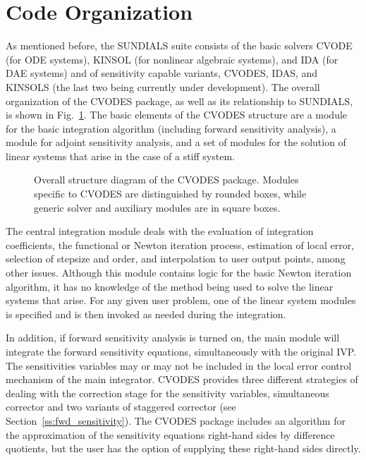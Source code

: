 \section{Code Organization}\label{s:organization}

As mentioned before, the SUNDIALS suite consists of the basic solvers
CVODE (for ODE systems), KINSOL (for nonlinear algebraic
systems), and IDA (for DAE systems) and of sensitivity capable variants,
CVODES, IDAS, and KINSOLS (the last two being currently under development).
%
The overall organization of the CVODES package, as well as its relationship
to SUNDIALS, is shown in Fig.~\ref{f:cvsorg}.  
The basic elements of the CVODES structure are a module for
the basic integration algorithm (including forward sensitivity analysis),
a module for adjoint sensitivity analysis, and a set of modules for the solution
of linear systems that arise in the case of a stiff system.  
\begin{figure}
\centerline{}
\caption {Overall structure diagram of the CVODES package.
  Modules specific to CVODES are distinguished by rounded boxes, while 
  generic solver and auxiliary modules are in square boxes.}
\label{f:cvsorg}
\end{figure}

The central integration module deals with the evaluation of integration coefficients,
the functional or Newton iteration process, estimation of local error,
selection of stepsize and order, and interpolation to user output
points, among other issues.  Although this module contains logic for
the basic Newton iteration algorithm, it has no knowledge of the
method being used to solve the linear systems that arise.  For any
given user problem, one of the linear system modules is specified and
is then invoked as needed during the integration. 

In addition, if forward sensitivity analysis is turned on, the main module 
will integrate the forward sensitivity equations, simultaneously with the original IVP.
The sensitivities variables may or may not be included in the local error control
mechanism of the main integrator.
CVODES provides three different strategies of dealing with the correction
stage for the sensitivity variables, simultaneous corrector and
two variants of staggered corrector (see Section~\ref{ss:fwd_sensitivity}).
The CVODES package includes an algorithm for the approximation of the sensitivity 
equations right-hand sides by difference quotients, but the user has the option of 
supplying these right-hand sides directly.

